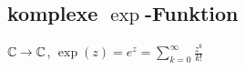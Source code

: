\subsection*{komplexe \texorpdfstring{$\exp$}{Exponential}-Funktion}
$\mathbb C \rightarrow \mathbb C$, $\exp(z) = e^z = \sum_{k = 0}^\infty \frac{z^k}{k!}$
